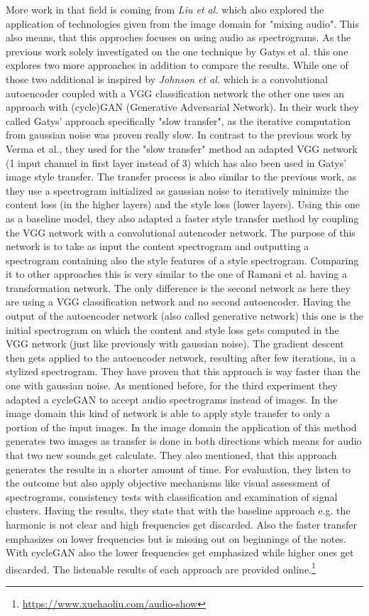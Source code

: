 More work in that field is coming from \textit{Liu et al.} \cite{Liu2019} which also explored the application of technologies given from the image domain for "mixing audio". This also means, that this approches focuses on using audio as spectrograms. As the previous work solely investigated on the one technique by Gatys et al. this one explores two more approaches in addition to compare the results. While one of those two additional is inspired by \textit{Johnson et al.} which is a convolutional autoencoder coupled with a VGG classification network the other one uses an approach with (cycle)GAN (Generative Adversarial Network). In their work they called Gatys' approach specifically "slow transfer", as the iterative computation from gaussian noise was proven really slow. In contrast to the previous work by Verma et al., they used for the "slow transfer" method an adapted VGG network (1 input channel in first layer instead of 3) which has also been used in Gatys' image style transfer. The transfer process is also similar to the previous work, as they use a spectrogram initialized as gaussian noise to iteratively minimize the content loss (in the higher layers) and the style loss (lower layers). Using this one as a baseline model, they also adapted a faster style transfer method by coupling the VGG network with a convolutional autencoder network. The purpose of this network is to take as input the content spectrogram and outputting a spectrogram containing also the style features of a style spectrogram. Comparing it to other approaches this is very similar to the one of Ramani et al. having a transformation network. The only difference is the second network as here they are using a VGG classification network and no second autoencoder. Having the output of the autoencoder network (also called generative network) this one is the initial spectrogram on which the content and style loss gets computed in the VGG network (just like previously with gaussian noise). The gradient descent then gets applied to the autoencoder network, resulting after few iterations, in a stylized spectrogram. They have proven that this approach is way faster than the one with gaussian noise. As mentioned before, for the third experiment they adapted a cycleGAN to accept audio spectrograms instead of images. In the image domain this kind of network is able to apply style transfer to only a portion of the input images. In the image domain the application of this method generates two images as transfer is done in both directions which means for audio that two new sounds get calculate. They also mentioned, that this approach generates the results in a shorter amount of time. For evaluation, they listen to the outcome but also apply objective mechanisms like visual assessment of spectrograms, consistency tests with classification and examination of signal clusters. Having the results, they state that with the baseline approach e.g. the harmonic is not clear and high frequencies get discarded. Also the faster transfer emphasizes on lower frequencies but is missing out on beginnings of the notes. With cycleGAN also the lower frequencies get emphasized while higher ones get discarded. The listenable results of each approach are provided online.\footnote{\url{https://www.xuehaoliu.com/audio-show}}\\
